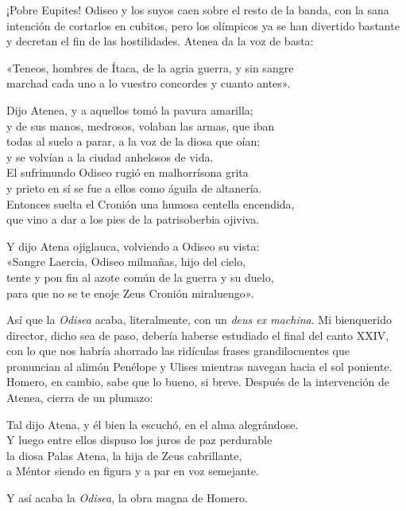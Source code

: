¡Pobre Eupites! Odiseo y los suyos caen sobre el resto de la banda, con la sana intención de cortarlos en cubitos, pero los olímpicos ya se han divertido bastante y decretan el fin de las hostilidades. Atenea da la voz de basta:

\begin{versocita}
«Teneos, hombres de Ítaca, de la agria guerra, y sin sangre\\
marchad cada uno a lo vuestro concordes y cuanto antes».
\end{versocita}

\begin{versocita}
Dijo Atenea, y a aquellos tomó la pavura amarilla;\\
y de sus manos, medrosos, volaban las armas, que iban\\
todas al suelo a parar, a la voz de la diosa que oían;\\
y se volvían a la ciudad anhelosos de vida.\\
El sufrimundo Odiseo rugió en malhorrísona grita\\
y prieto en sí se fue a ellos como águila de altanería.\\
Entonces suelta el Cronión una humosa centella encendida,\\
que vino a dar a los pies de la patrisoberbia ojiviva.
\end{versocita}

\begin{versocita}
Y dijo Atena ojiglauca, volviendo a Odiseo su vista:\\
«Sangre Laercia, Odiseo milmañas, hijo del cielo,\\
tente y pon fin al azote común de la guerra y su duelo,\\
para que no se te enoje Zeus Cronión miraluengo».
\end{versocita}

Así que la \emph{Odisea} acaba, literalmente, con un \emph{deus ex machina}. Mi bienquerido director, dicho sea de paso, debería haberse estudiado el final del canto XXIV, con lo que nos habría ahorrado las ridículas frases grandilocuentes que pronuncian al alimón Penélope y Ulises mientras navegan hacia el sol poniente. Homero, en cambio, sabe que lo bueno, si breve. Después de la intervención de Atenea, cierra de un plumazo:

\begin{versocita}
Tal dijo Atena, y él bien la escuchó, en el alma alegrándose.\\
Y luego entre ellos dispuso los juros de paz perdurable\\
la diosa Palas Atena, la hija de Zeus cabrillante,\\
a Méntor siendo en figura y a par en voz semejante.
\end{versocita}

Y así acaba la \emph{Odisea}, la obra magna de Homero.
